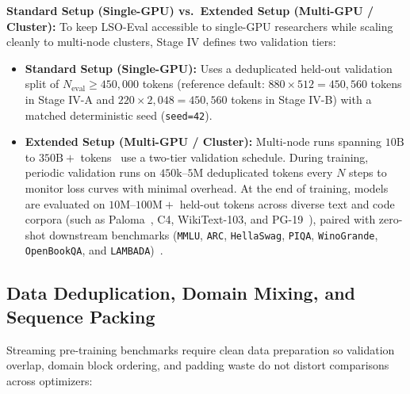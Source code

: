 \documentclass[11pt,a4paper]{article}
\renewcommand{\_}{\origunderscore\allowbreak}
\begin{document}
\noindent
\textbf{Standard Setup (Single-GPU) vs.\ Extended Setup (Multi-GPU / Cluster):} To keep LSO-Eval accessible to single-GPU researchers while scaling cleanly to multi-node clusters, Stage IV defines two validation tiers:
\begin{itemize}[leftmargin=1.8em, itemsep=0.35em]
    \item \textbf{Standard Setup (Single-GPU):} Uses a deduplicated held-out validation split of $N_{\text{eval}} \ge 450,000$ tokens (reference default: $880 \times 512 = 450,560$ tokens in Stage IV-A and $220 \times 2,048 = 450,560$ tokens in Stage IV-B) with a matched deterministic seed (\texttt{seed=42}).
    \item \textbf{Extended Setup (Multi-GPU / Cluster):} Multi-node runs spanning $10\text{B}$ to $350\text{B}+$ tokens~\cite{liang2026cautious,penedo2024fineweb} use a two-tier validation schedule. During training, periodic validation runs on $450\text{k}$--$5\text{M}$ deduplicated tokens every $N$ steps to monitor loss curves with minimal overhead. At the end of training, models are evaluated on $10\text{M}$--$100\text{M}+$ held-out tokens across diverse text and code corpora (such as Paloma~\cite{magnusson2024paloma}, C4, WikiText-103, and PG-19~\cite{yang2024gla}), paired with zero-shot downstream benchmarks (\texttt{MMLU}, \texttt{ARC}, \texttt{HellaSwag}, \texttt{PIQA}, \texttt{WinoGrande}, \texttt{OpenBookQA}, and \texttt{LAMBADA})~\cite{liang2026cautious,penedo2024fineweb,yang2024gla}.
\end{itemize}

\subsection{Data Deduplication, Domain Mixing, and Sequence Packing}
\noindent
Streaming pre-training benchmarks require clean data preparation so validation overlap, domain block ordering, and padding waste do not distort comparisons across optimizers:
\end{document}
